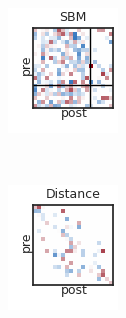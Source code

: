 \begin{figure}[t!]
\begin{subfigure}[b]{1.10in}
  \end{subfigure}
  ~
  \hspace{-.1in}
  \begin{subfigure}[b]{1.10in}
    \centering
    \includegraphics[width=\textwidth]{figures/ch3/SBM-Gaussian.png}
  \end{subfigure}
  ~
  \hspace{-.1in}
  \begin{subfigure}[b]{1.10in}
    \centering
    \includegraphics[width=\textwidth]{figures/ch3/Distance-Gaussian.png}

\end{subfigure}
\end{figure}
